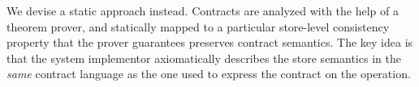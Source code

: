 We devise a static approach instead.  Contracts are analyzed with the help
of a theorem prover, and statically mapped to a particular store-level
consistency property that the prover guarantees preserves contract
semantics. The key idea is that the system implementor axiomatically
describes the store semantics in the \emph{same} contract language as the
one used to express the contract on the operation.  
